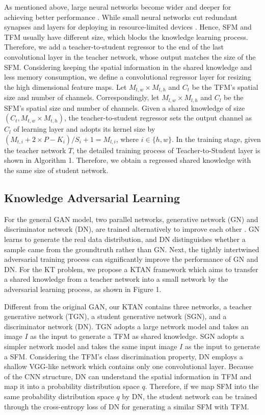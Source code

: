 \documentclass[letterpaper]{article} %
\begin{document}
As mentioned above, large neural networks become wider and deeper for achieving better performance \cite{he2016deep}. While small neural networks cut redundant synapses and layers for deploying in resource-limited devices \cite{howard2017mobilenets}. Hence, SFM and TFM usually have different size, which blocks the knowledge learning process. Therefore, we add a teacher-to-student regressor to the end of the last convolutional layer in the teacher network, whose output matches the size of the SFM. Considering keeping the spatial information in the shared knowledge and less memory consumption, we define a convolutional regressor layer for resizing the high dimensional feature maps. Let $M_{t, w}\times M_{t, h} $ and $C_{t}$ be the TFM's spatial size and number of channels. Correspondingly, let $M_{l, w}\times M_{l, h} $ and $C_{l}$ be the SFM's spatial size and number of channels. Given a shared knowledge of size $( C_{t}, M_{t, w}\times M_{t, h})$, the teacher-to-student regressor sets the output channel as $C_{l}$ of learning layer and adopts its kernel size by $(M_{t, i}+2\times P -K_{i})/S_{i}+1=M_{l, i}$, where $i\in \{h, w\}$. In the training stage, given the teacher network $T$, the detailed training process of Teacher-to-Student layer is shown in Algorithm 1.
Therefore, we obtain a regressed shared knowledge with the same size of student network.

\subsection{Knowledge Adversarial Learning}

For the general GAN model, two parallel networks, generative network (GN) and discriminator network (DN), are trained alternatively to improve each other \cite{goodfellow2014generative}. GN learns to generate the real data distribution, and DN distinguishes whether a sample came from the groundtruth rather than GN. Next, the tightly intertwined adversarial training process can significantly improve the performance of GN and DN. For the KT problem, we propose a KTAN framework which aims to transfer a shared knowledge from a teacher network into a small network by the adversarial learning process, as shown in Figure 1.

Different from the original GAN, our KTAN contains three networks, a teacher generative network (TGN), a student generative network (SGN), and a discriminator network (DN). TGN adopts a large network model and takes an image $I$ as the input to generate a TFM as shared knowledge. SGN adopts a simpler network model and takes the same input image $I$ as the input to generate a SFM. Considering the TFM's class discrimination property, DN employs a shallow VGG-like network which contains only one convolutional layer. Because of the CNN structure, DN can understand the spatial information in TFM and map it into a probability distribution space $q$. Therefore, if we map SFM into the same probability distribution space $q$ by DN, the student network can be trained through the cross-entropy loss of DN for generating a similar SFM with TFM.
\end{document}
